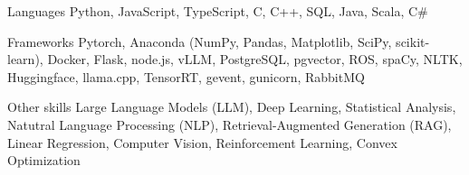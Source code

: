 
\begin{cvskills}
  \cvskill
    {Languages} %
    {Python, JavaScript, TypeScript, C, C++, SQL, Java, Scala, C\#} %

  \cvskill
    {Frameworks} %
    {Pytorch, Anaconda (NumPy, Pandas, Matplotlib, SciPy, scikit-learn), Docker, Flask, node.js, vLLM, PostgreSQL, pgvector, ROS, spaCy, NLTK, Huggingface, llama.cpp, TensorRT, gevent, gunicorn, RabbitMQ} %

  \cvskill
  {Other skills}
  {Large Language Models (LLM), Deep Learning, Statistical Analysis, Natutral Language Processing (NLP), Retrieval-Augmented Generation (RAG), Linear Regression, Computer Vision, Reinforcement Learning, Convex Optimization}
\end{cvskills}
